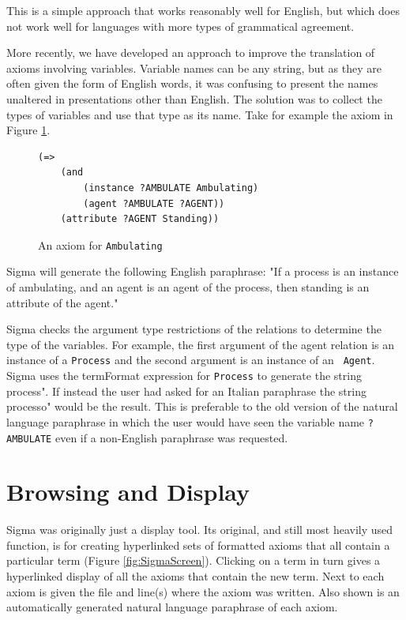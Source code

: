 \documentclass{book}
\begin{document}
This is a simple approach that works reasonably well for English, but which does
not work well for languages with more types of grammatical agreement.

More recently, we have developed an approach to improve the translation of
axioms involving variables.  Variable names can be any string, but as they are
often given the form of English words, it was confusing to present the names
unaltered in presentations other than English. The solution was to collect the
types of variables and use that type as its name.  Take for example the axiom in
Figure \ref{fig:Ambulating}.

\begin{figure}
\begin{framed}
\begin{verbatim}
(=> 
    (and 
        (instance ?AMBULATE Ambulating) 
        (agent ?AMBULATE ?AGENT)) 
    (attribute ?AGENT Standing)) 
\end{verbatim}
\caption{An axiom for {\tt Ambulating}}
\label{fig:Ambulating}
\end{framed}
\end{figure}

Sigma will generate the following English paraphrase: "If a process is an
instance of ambulating, and an agent is an agent of the process, then standing
is an attribute of the agent."

Sigma checks the argument type restrictions of the relations to determine the
type of the variables.  For example, the first argument of the agent relation is
an instance of a {\tt Process} and the second argument is an instance of an {\tt
Agent}. Sigma uses the termFormat expression for {\tt Process} to generate the
string process".  If instead the user had asked for an Italian paraphrase the
string processo" would be the result.  This is preferable to the old version of
the natural language paraphrase in which the user would have seen the variable
name {\tt ?AMBULATE} even if a non-English paraphrase was requested.

\section{Browsing and Display}
\label{chap:KnowEngi:sec:Brow}

Sigma was originally just a display tool. Its original, and still most heavily
used function, is for creating hyperlinked sets of formatted axioms that all
contain a particular term (Figure \ref{fig:SigmaScreen}). Clicking on a term in
turn gives a hyperlinked display of all the axioms that contain the new term.
Next to each axiom is given the file and line(s) where the axiom was written.
Also shown is an automatically generated natural language paraphrase of each
axiom. 
\end{document}
